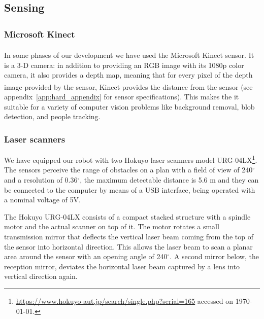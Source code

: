 \begin{figure}[ht]
      \label{fig:evolution}
\end{figure}

\subsection{Sensing}
\subsubsection{Microsoft Kinect\textsuperscript{\textregistered}\label{sec:kinectsec}}
In some phases of our development we have used the Microsoft Kinect\textsuperscript{\textregistered} sensor. It is a 3-D camera: in addition to providing an RGB image with its 1080p color camera, it also provides a depth map,  meaning that for every pixel of the depth image provided by the sensor, Kinect\textsuperscript{\textregistered} provides the distance from the sensor (see appendix~\ref{app:hard_appendix} for sensor specifications). This makes the it suitable for a variety of computer vision problems like background removal, blob detection, and people tracking.

\subsubsection{Laser scanners}\label{sec:lasers_hokuyo}
We have equipped our robot with two Hokuyo laser scanners model URG-04LX\footnote{\url{https://www.hokuyo-aut.jp/search/single.php?serial=165} accessed on \today.}. The sensors perceive the range of obstacles on a plan with a field of view of 240$^\circ$ and a resolution of 0.36$^\circ$, the maximum detectable distance is 5.6 m and they can be connected to the computer by means of a USB interface, being operated with a nominal voltage of 5V.

The Hokuyo URG-04LX consists of a compact stacked structure with a spindle motor and the actual scanner on top of it. The motor rotates a small transmission mirror that deflects the vertical laser beam coming from the top of the sensor into horizontal direction. This allows the laser beam to scan a planar area around the sensor with an opening angle of 240$^\circ$. A second mirror below, the reception mirror, deviates the horizontal laser beam captured by a lens into vertical direction again.


